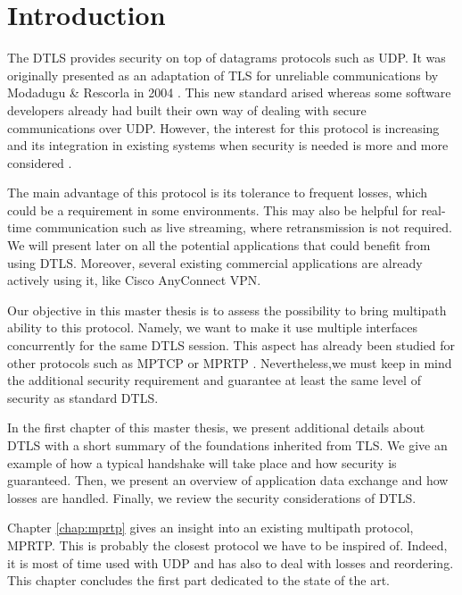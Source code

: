 \chapter*{Introduction}

The DTLS provides security on top of datagrams protocols such as UDP. It was originally presented as an adaptation of TLS \cite{rfc5246} for unreliable communications by Modadugu \& Rescorla in 2004 \cite{modadugu2004design}. This new standard arised whereas some software developers already had built their own way of dealing with secure communications over UDP. However, the interest for this protocol is increasing and its integration in existing systems when security is needed is more and more considered \cite{dtls-as-subtransport}.

The main advantage of this protocol is its tolerance to frequent losses, which could be a requirement in some environments. This may also be helpful for real-time communication such as live streaming, where retransmission is not required. We will present later on all the potential applications that could benefit from using DTLS. Moreover, several existing commercial applications are already actively using it, like Cisco AnyConnect VPN\cite{anyconnect}.


Our objective in this master thesis is to assess the possibility to bring multipath ability to this protocol. Namely, we want to make it use multiple interfaces concurrently for the same DTLS session. This aspect has already been studied for other protocols such as MPTCP \cite{RFC6824} or MPRTP \cite{singh-avtcore-mprtp}. Nevertheless,we must keep in mind the additional security requirement and guarantee at least the same level of security as standard DTLS.

In the first chapter of this master thesis, we present additional details about DTLS with a short summary of the foundations inherited from TLS. We give an example of how a typical handshake will take place and how security is guaranteed. Then, we present an overview of application data exchange and how losses are handled. Finally, we review the security considerations of DTLS.

Chapter \ref{chap:mprtp} gives an insight into an existing multipath protocol, MPRTP. This is probably the closest protocol we have to be inspired of. Indeed, it is most of time used with UDP and has also to deal with losses and reordering. This chapter concludes the first part dedicated to the state of the art.

